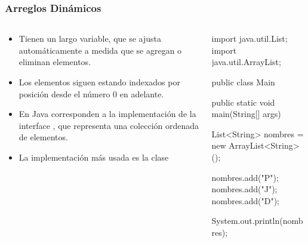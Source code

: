 \documentclass{beamer}
\begin{document}
\begin{frame}[fragile]
  \frametitle{Arreglos Dinámicos}

  \begin{columns}
    \begin{column}{0.4\textwidth}
      \begin{footnotesize}
        \begin{itemize}
        \item Tienen un largo variable, que se ajusta automáticamente
          a medida que se agregan o eliminan elementos.
          
        \item Los elementos siguen estando indexados por posición
          desde el número 0 en adelante.
          
        \item En Java corresponden a la implementación de la interface
          , que representa una colección ordenada de
          elementos.
          
        \item La implementación más usada es la clase 
          
        \end{itemize}
      \end{footnotesize}
    \end{column}
    \begin{column}{0.6\textwidth}
      
      \begin{jsmall}
        import java.util.List;
        import java.util.ArrayList;
        
        public class Main {
          public static void main(String[] args) {
            List<String> nombres =
                new ArrayList<String>();

            nombres.add("P");
            nombres.add("J");
            nombres.add("D");

            System.out.println(nombres);
          }
        }
      \end{jsmall}
      
    \end{column}
  \end{columns}

\end{frame}
\end{document}
